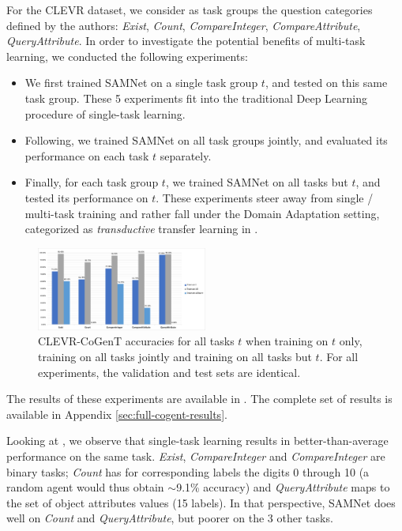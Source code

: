 For the CLEVR dataset, we consider as task groups the question categories defined by the authors: \textit{Exist}, \textit{Count}, \textit{CompareInteger}, \textit{CompareAttribute}, \textit{QueryAttribute}. In order to investigate the potential benefits of multi-task learning, we conducted the following experiments:

\begin{itemize}
	\compresslist
	\item We first trained SAMNet on a single task group $t$, and tested on this same task group. These 5 experiments fit into the traditional Deep Learning procedure of single-task learning.
	\item Following, we trained SAMNet on all task groups jointly, and evaluated its performance on each task $t$ separately.
	\item Finally, for each task group $t$, we trained SAMNet on all tasks but $t$, and tested its performance on $t$. These experiments steer away from single / multi-task training and rather fall under the Domain Adaptation setting, categorized as \emph{transductive} transfer learning in \cite{pan2009survey}.
\end{itemize}

\begin{figure}[!t]
	\centering
	\includegraphics[width=0.5\textwidth]{img/results/CoGenT_results.pdf}
	\caption{CLEVR-CoGenT accuracies for all tasks $t$ when training on $t$ only, training on all tasks jointly and training on all tasks but $t$. For all experiments, the validation and test sets are identical.}
	\label{fig:CoGenT-results}
\end{figure}

The results of these experiments are available in . The complete set of results is available in Appendix \ref{sec:full-cogent-results}.


Looking at , we observe that single-task learning results in better-than-average performance on the same task. \textit{Exist}, \textit{CompareInteger} and \textit{CompareInteger} are binary tasks; \textit{Count} has for corresponding labels the digits 0 through 10 (a random agent would thus obtain $\sim$9.1\% accuracy) and \textit{QueryAttribute} maps to the set of object attributes values (15 labels). In that perspective, SAMNet does well on \textit{Count} and \textit{QueryAttribute}, but poorer on the 3 other tasks.


